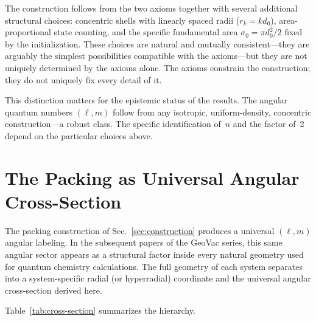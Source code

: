 \documentclass[aps,prl,reprint,amsmath,amssymb]{revtex4-2}
\begin{document}
The construction follows from the two axioms together with several
additional structural choices: concentric shells with linearly spaced
radii ($r_k = k d_0$), area-proportional state counting, and the
specific fundamental area $\sigma_0 = \pi d_0^2 / 2$ fixed by the
initialization.  These choices are natural and mutually
consistent---they are arguably the simplest possibilities compatible
with the axioms---but they are not uniquely determined by the axioms
alone.  The axioms constrain the construction; they do not uniquely
fix every detail of it.

This distinction matters for the epistemic status of the results.  The
angular quantum numbers $(\ell, m)$ follow from any isotropic,
uniform-density, concentric construction---a robust class.  The
specific identification of~$n$ and the factor of~2 depend on the
particular choices above.


\section{The Packing as Universal Angular Cross-Section}
\label{sec:cross-section}

The packing construction of Sec.~\ref{sec:construction} produces a
universal $(\ell, m)$ angular labeling.  In the subsequent papers of
the GeoVac series, this same angular sector appears as a structural
factor inside every natural geometry used for quantum chemistry
calculations.  The full geometry of each system separates into a
system-specific radial (or hyperradial) coordinate and the universal
angular cross-section derived here.

Table~\ref{tab:cross-section} summarizes the hierarchy.
\end{document}
